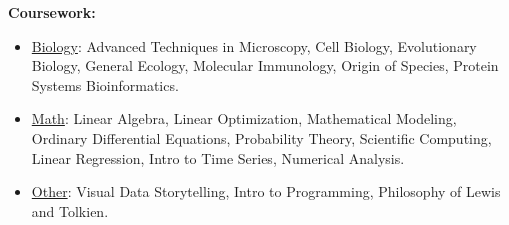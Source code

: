 \textbf{Coursework:}

\begin{itemize}[noitemsep]
\item \ul{Biology}: Advanced Techniques in Microscopy, Cell Biology, Evolutionary Biology, General Ecology, Molecular Immunology, Origin of Species, Protein Systems Bioinformatics.
\item \ul{Math}: Linear Algebra, Linear Optimization, Mathematical Modeling, Ordinary Differential Equations, Probability Theory, Scientific Computing, Linear Regression, Intro to Time Series, Numerical Analysis.
\item \ul{Other}: Visual Data Storytelling, Intro to Programming, Philosophy of Lewis and Tolkien.
\end{itemize}